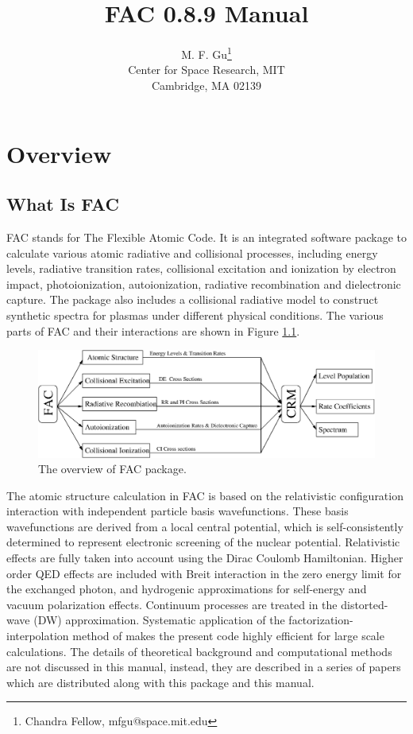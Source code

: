 \documentclass[twoside,letterpaper]{refrep}
\newcommand{\facversion}{{0.8.9}\xspace}
\begin{document}
\title{FAC \facversion Manual}
\author{M. F. Gu\thanks{Chandra Fellow,  mfgu@space.mit.edu} \\
Center for Space Research, MIT \\ Cambridge, MA 02139}

\date{}

\maketitle

\tableofcontents

\chapter{Overview}
\label{cha:overview}

\section{What Is FAC}
FAC stands for The Flexible Atomic Code. It is an
integrated software package to calculate various atomic radiative and
collisional processes, including energy levels, radiative transition rates,
collisional excitation and 
ionization by electron impact, photoionization, autoionization, radiative
recombination and dielectronic capture. The package also includes a
collisional radiative model to construct synthetic spectra for plasmas under
different physical conditions. The various parts of FAC and their
interactions are shown in Figure \ref{fig:flow}. 

\begin{figure}
\includegraphics[width=6in]{flow.eps}
\caption{\label{fig:flow}The overview of FAC package.}
\end{figure}

The atomic structure calculation in FAC is based on the relativistic
configuration interaction with independent particle basis wavefunctions. These
basis wavefunctions are derived from a local central potential, which is
self-consistently determined to represent electronic screening of the nuclear
potential. Relativistic effects are fully taken into account using the Dirac
Coulomb Hamiltonian. Higher order QED effects are included with Breit
interaction in the zero energy limit for the exchanged photon, and hydrogenic
approximations for self-energy and vacuum polarization effects. 
Continuum processes are treated
in the distorted-wave (DW) approximation. Systematic application of the
factorization-interpolation method of \citet{barshalom88} makes the present
code highly efficient for large scale calculations. The details of theoretical
background and computational methods are not discussed in this manual,
instead, they are described in a series of papers which are distributed along
with this package and this manual.
\end{document}
